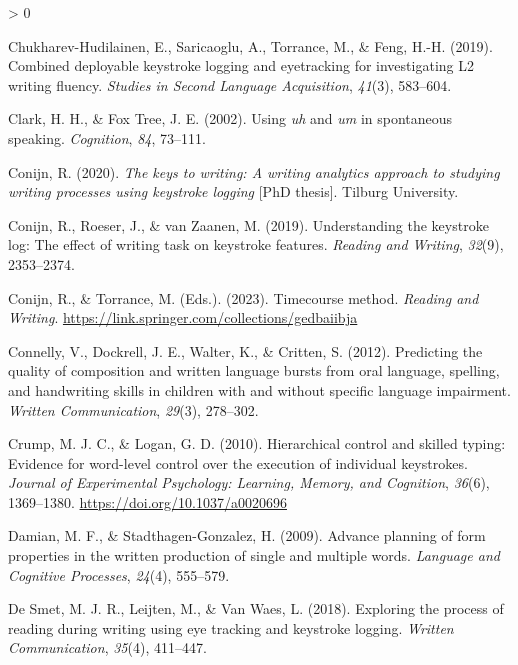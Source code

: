 \documentclass[
  english,
  man,floatsintext]{apa7}
\newlength{\cslhangindent}
\newenvironment{CSLReferences}[2] %
 {%
  \setlength{\parindent}{0pt}
  \ifodd #1 \everypar{\setlength{\hangindent}{\cslhangindent}}\ignorespaces\fi
  \ifnum #2 > 0
  \setlength{\parskip}{#2\baselineskip}
  \fi
 }%
 {}
\begin{document}
\begin{CSLReferences}{1}{0}
\leavevmode\hypertarget{ref-chukharev2019combined}{}%
Chukharev-Hudilainen, E., Saricaoglu, A., Torrance, M., \& Feng, H.-H. (2019). Combined deployable keystroke logging and eyetracking for investigating {L2} writing fluency. \emph{Studies in Second Language Acquisition}, \emph{41}(3), 583--604.

\leavevmode\hypertarget{ref-Clark2002}{}%
Clark, H. H., \& Fox Tree, J. E. (2002). Using \emph{uh} and \emph{um} in spontaneous speaking. \emph{Cognition}, \emph{84}, 73--111.

\leavevmode\hypertarget{ref-conijn2020keys}{}%
Conijn, R. (2020). \emph{The keys to writing: A writing analytics approach to studying writing processes using keystroke logging} {[}PhD thesis{]}. Tilburg University.

\leavevmode\hypertarget{ref-conijn2019understanding}{}%
Conijn, R., Roeser, J., \& van Zaanen, M. (2019). Understanding the keystroke log: The effect of writing task on keystroke features. \emph{Reading and Writing}, \emph{32}(9), 2353--2374.

\leavevmode\hypertarget{ref-conijn2021timecourse}{}%
Conijn, R., \& Torrance, M. (Eds.). (2023). Timecourse method. \emph{Reading and Writing}. \url{https://link.springer.com/collections/gedbaiibja}

\leavevmode\hypertarget{ref-connelly2012predicting}{}%
Connelly, V., Dockrell, J. E., Walter, K., \& Critten, S. (2012). Predicting the quality of composition and written language bursts from oral language, spelling, and handwriting skills in children with and without specific language impairment. \emph{Written Communication}, \emph{29}(3), 278--302.

\leavevmode\hypertarget{ref-crump2010hierarchical}{}%
Crump, M. J. C., \& Logan, G. D. (2010). Hierarchical control and skilled typing: Evidence for word-level control over the execution of individual keystrokes. \emph{Journal of Experimental Psychology: Learning, Memory, and Cognition}, \emph{36}(6), 1369--1380. \url{https://doi.org/10.1037/a0020696}

\leavevmode\hypertarget{ref-dam09}{}%
Damian, M. F., \& Stadthagen-Gonzalez, H. (2009). Advance planning of form properties in the written production of single and multiple words. \emph{Language and Cognitive Processes}, \emph{24}(4), 555--579.

\leavevmode\hypertarget{ref-de2018exploring}{}%
De Smet, M. J. R., Leijten, M., \& Van Waes, L. (2018). Exploring the process of reading during writing using eye tracking and keystroke logging. \emph{Written Communication}, \emph{35}(4), 411--447.


\end{CSLReferences}
\end{document}
